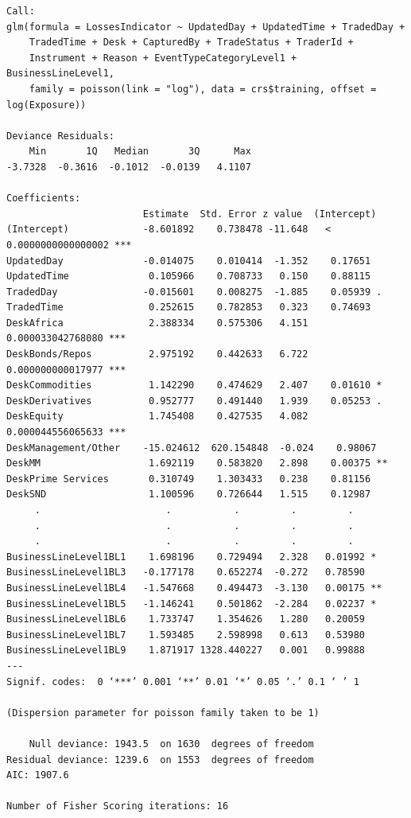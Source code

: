 \documentclass[]{article}
\begin{document}
\singlespacing
\begin{verbatim}
Call:
glm(formula = LossesIndicator ~ UpdatedDay + UpdatedTime + TradedDay + 
    TradedTime + Desk + CapturedBy + TradeStatus + TraderId + 
    Instrument + Reason + EventTypeCategoryLevel1 + BusinessLineLevel1, 
    family = poisson(link = "log"), data = crs$training, offset = log(Exposure))

Deviance Residuals: 
    Min       1Q   Median       3Q      Max  
-3.7328  -0.3616  -0.1012  -0.0139   4.1107  

Coefficients:
                        Estimate  Std. Error z value  (Intercept)         
(Intercept)             -8.601892    0.738478 -11.648   < 0.0000000000000002 ***
UpdatedDay              -0.014075    0.010414  -1.352    0.17651
UpdatedTime              0.105966    0.708733   0.150    0.88115 
TradedDay               -0.015601    0.008275  -1.885    0.05939 .
TradedTime               0.252615    0.782853   0.323    0.74693
DeskAfrica               2.388334    0.575306   4.151    0.000033042768080 ***
DeskBonds/Repos          2.975192    0.442633   6.722    0.000000000017977 ***
DeskCommodities          1.142290    0.474629   2.407    0.01610 *
DeskDerivatives          0.952777    0.491440   1.939    0.05253 . 
DeskEquity               1.745408    0.427535   4.082    0.000044556065633 ***
DeskManagement/Other    -15.024612  620.154848  -0.024    0.98067
DeskMM                   1.692119    0.583820   2.898    0.00375 ** 
DeskPrime Services       0.310749    1.303433   0.238    0.81156 
DeskSND                  1.100596    0.726644   1.515    0.12987                                 
     .                      .           .         .         .
     .                      .           .         .         .
     .                      .           .         .         .
BusinessLineLevel1BL1    1.698196    0.729494   2.328   0.01992 *
BusinessLineLevel1BL3   -0.177178    0.652274  -0.272   0.78590
BusinessLineLevel1BL4   -1.547668    0.494473  -3.130   0.00175 **
BusinessLineLevel1BL5   -1.146241    0.501862  -2.284   0.02237 *
BusinessLineLevel1BL6    1.733747    1.354626   1.280   0.20059
BusinessLineLevel1BL7    1.593485    2.598998   0.613   0.53980
BusinessLineLevel1BL9    1.871917 1328.440227   0.001   0.99888 
---
Signif. codes:  0 ‘***’ 0.001 ‘**’ 0.01 ‘*’ 0.05 ‘.’ 0.1 ‘ ’ 1

(Dispersion parameter for poisson family taken to be 1)

    Null deviance: 1943.5  on 1630  degrees of freedom
Residual deviance: 1239.6  on 1553  degrees of freedom
AIC: 1907.6

Number of Fisher Scoring iterations: 16

\end{verbatim}
\doublespacing
\end{document}
